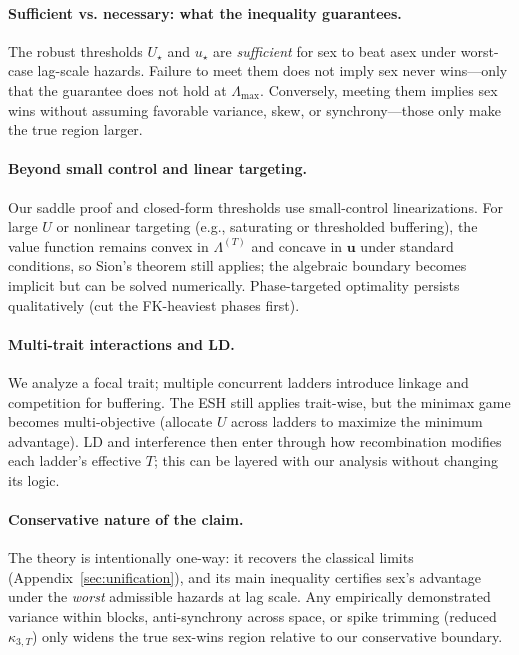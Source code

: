 \documentclass[11pt]{article}
\theoremstyle{upright}
\newcommand{\horizon}{\Lambda}
\newcommand{\Lmax}{\horizon^{(T)}_{\max}}
\newcommand{\hazT}[1]{\Lambda^{(#1)}}          %
\renewcommand{\Lmax}{\Lambda_{\max}}
\begin{document}
\paragraph{Sufficient vs. necessary: what the inequality guarantees.}
The robust thresholds $U_\star$ and $u_\star$ are \emph{sufficient} for sex to beat asex under worst-case lag-scale hazards. Failure to meet them does not imply sex never wins—only that the guarantee does not hold at $\Lmax$. Conversely, meeting them implies sex wins without assuming favorable variance, skew, or synchrony—those only make the true region larger.

\paragraph{Beyond small control and linear targeting.}
Our saddle proof and closed-form thresholds use small-control linearizations. For large $U$ or nonlinear targeting (e.g., saturating or thresholded buffering), the value function remains convex in $\hazT{T}$ and concave in $\mathbf u$ under standard conditions, so Sion’s theorem still applies; the algebraic boundary becomes implicit but can be solved numerically. Phase-targeted optimality persists qualitatively (cut the FK-heaviest phases first).

\paragraph{Multi-trait interactions and LD.}
We analyze a focal trait; multiple concurrent ladders introduce linkage and competition for buffering. The ESH still applies trait-wise, but the minimax game becomes multi-objective (allocate $U$ across ladders to maximize the minimum advantage). LD and interference then enter through how recombination modifies each ladder’s effective $T$; this can be layered with our analysis without changing its logic.

\paragraph{Conservative nature of the claim.}
The theory is intentionally one-way: it recovers the classical limits (Appendix~\ref{sec:unification}), and its main inequality certifies sex’s advantage under the \emph{worst} admissible hazards at lag scale. Any empirically demonstrated variance within blocks, anti-synchrony across space, or spike trimming (reduced $\kappa_{3,T}$) only widens the true sex-wins region relative to our conservative boundary.
\end{document}
